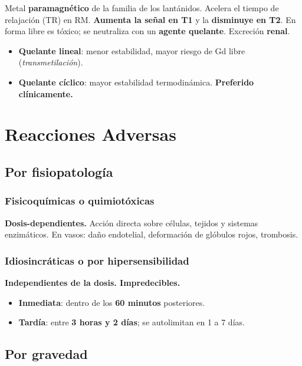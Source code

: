 Metal \textbf{paramagnético} de la familia de los lantánidos. Acelera el tiempo de relajación (TR) en RM. \textbf{Aumenta la señal en T1} y la \textbf{disminuye en T2}. En forma libre es tóxico; se neutraliza con un \textbf{agente quelante}. Excreción \textbf{renal}.

\begin{itemize}[noitemsep]
  \item \textbf{Quelante lineal}: menor estabilidad, mayor riesgo de Gd libre (\textit{transmetilación}).
  \item \textbf{Quelante cíclico}: mayor estabilidad termodinámica. \textbf{Preferido clínicamente.}
\end{itemize}

\section*{Reacciones Adversas}

\subsection*{Por fisiopatología}

\subsubsection*{Fisicoquímicas o quimiotóxicas}
\textbf{Dosis-dependientes.} Acción directa sobre células, tejidos y sistemas enzimáticos. En vasos: daño endotelial, deformación de glóbulos rojos, trombosis.

\subsubsection*{Idiosincráticas o por hipersensibilidad}
\textbf{Independientes de la dosis. Impredecibles.}
\begin{itemize}[noitemsep]
  \item \textbf{Inmediata}: dentro de los \textbf{60 minutos} posteriores.
  \item \textbf{Tardía}: entre \textbf{3 horas y 2 días}; se autolimitan en 1 a 7 días.
\end{itemize}

\subsection*{Por gravedad}

